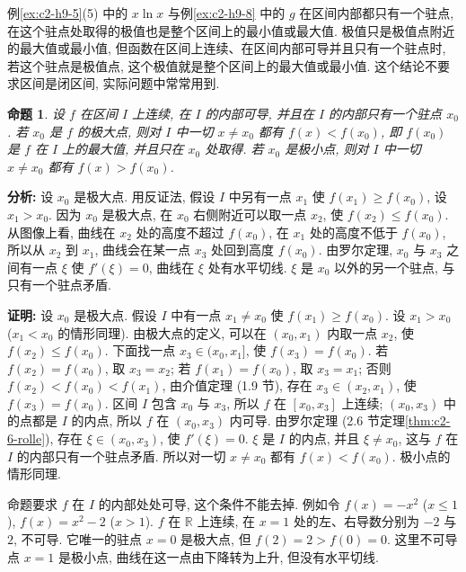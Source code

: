 \documentclass[UTF8,openany]{ctexbook}
\theoremstyle{chinesetextbook}
\newenvironment{cnproof}{\par\indent\textbf{证明:} \ignorespaces}{\par}
\newtheorem*{propositionsingle}{命题}
\begin{document}
例\ref{ex:c2-h9-5}(5) 中的 $x\ln x$ 与例\ref{ex:c2-h9-8} 中的 $g$ 在区间内部都只有一个驻点, 在这个驻点处取得的极值也是整个区间上的最小值或最大值. 极值只是极值点附近的最大值或最小值, 但函数在区间上连续、在区间内部可导并且只有一个驻点时, 若这个驻点是极值点, 这个极值就是整个区间上的最大值或最小值. 这个结论不要求区间是闭区间, 实际问题中常常用到.
\begin{propositionsingle}
设 $f$ 在区间 $I$ 上连续, 在 $I$ 的内部可导, 并且在 $I$ 的内部只有一个驻点 $x_0$. 若 $x_0$ 是 $f$ 的极大点, 则对 $I$ 中一切 $x\ne x_0$ 都有 $f(x)<f(x_0)$, 即 $f(x_0)$ 是 $f$ 在 $I$ 上的最大值, 并且只在 $x_0$ 处取得. 若 $x_0$ 是极小点, 则对 $I$ 中一切 $x\ne x_0$ 都有 $f(x)>f(x_0)$.
\end{propositionsingle}
\par\indent\textbf{分析:} 设 $x_0$ 是极大点. 用反证法, 假设 $I$ 中另有一点 $x_1$ 使 $f(x_1)\ge f(x_0)$, 设 $x_1>x_0$. 因为 $x_0$ 是极大点, 在 $x_0$ 右侧附近可以取一点 $x_2$, 使 $f(x_2)\le f(x_0)$. 从图像上看, 曲线在 $x_2$ 处的高度不超过 $f(x_0)$, 在 $x_1$ 处的高度不低于 $f(x_0)$, 所以从 $x_2$ 到 $x_1$, 曲线会在某一点 $x_3$ 处回到高度 $f(x_0)$. 由罗尔定理, $x_0$ 与 $x_3$ 之间有一点 $\xi$ 使 $f'(\xi)=0$, 曲线在 $\xi$ 处有水平切线. $\xi$ 是 $x_0$ 以外的另一个驻点, 与只有一个驻点矛盾.
\begin{cnproof}
设 $x_0$ 是极大点. 假设 $I$ 中有一点 $x_1\ne x_0$ 使 $f(x_1)\ge f(x_0)$. 设 $x_1>x_0$ ($x_1<x_0$ 的情形同理). 由极大点的定义, 可以在 $(x_0,x_1)$ 内取一点 $x_2$, 使 $f(x_2)\le f(x_0)$. 下面找一点 $x_3\in(x_0,x_1]$, 使 $f(x_3)=f(x_0)$. 若 $f(x_2)=f(x_0)$, 取 $x_3=x_2$; 若 $f(x_1)=f(x_0)$, 取 $x_3=x_1$; 否则 $f(x_2)<f(x_0)<f(x_1)$, 由介值定理 (1.9 节), 存在 $x_3\in(x_2,x_1)$, 使 $f(x_3)=f(x_0)$. 区间 $I$ 包含 $x_0$ 与 $x_3$, 所以 $f$ 在 $[x_0,x_3]$ 上连续; $(x_0,x_3)$ 中的点都是 $I$ 的内点, 所以 $f$ 在 $(x_0,x_3)$ 内可导. 由罗尔定理 (2.6 节定理\ref{thm:c2-6-rolle}), 存在 $\xi\in(x_0,x_3)$, 使 $f'(\xi)=0$. $\xi$ 是 $I$ 的内点, 并且 $\xi\ne x_0$, 这与 $f$ 在 $I$ 的内部只有一个驻点矛盾. 所以对一切 $x\ne x_0$ 都有 $f(x)<f(x_0)$. 极小点的情形同理.
\end{cnproof}
命题要求 $f$ 在 $I$ 的内部处处可导, 这个条件不能去掉. 例如令 $f(x)=-x^2$ ($x\le1$), $f(x)=x^2-2$ ($x>1$). $f$ 在 $\mathbb R$ 上连续, 在 $x=1$ 处的左、右导数分别为 $-2$ 与 $2$, 不可导. 它唯一的驻点 $x=0$ 是极大点, 但 $f(2)=2>f(0)=0$. 这里不可导点 $x=1$ 是极小点, 曲线在这一点由下降转为上升, 但没有水平切线.
\end{document}
